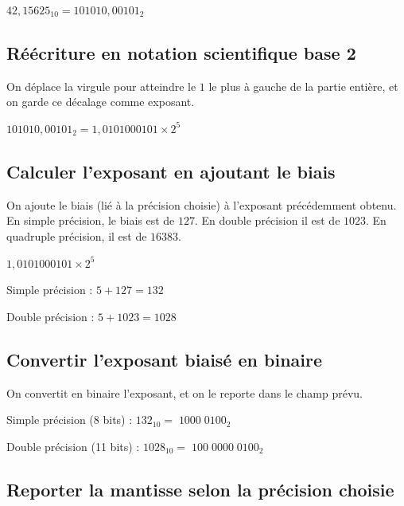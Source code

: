 \documentclass[11pt,a4paper]{article}
\begin{document}
$ 42,15625_{10} = 101010,00101_{2} $

\bigskip

\subsection{Réécriture en notation scientifique base 2}

\medskip

On déplace la virgule pour atteindre le $ 1 $ le plus à gauche de la partie entière, et on garde ce décalage comme exposant.

\medskip

$ 101010,00101_{2} = 1,0101000101 \times 2^{5} $

\bigskip

\subsection{Calculer l'exposant en ajoutant le biais}

\medskip

On ajoute le biais (lié à la précision choisie) à l'exposant précédemment obtenu.
En simple précision, le biais est de $ 127 $. En double précision il est de $ 1023 $. En quadruple précision, il est de $ 16383 $.

\medskip

$ 1,0101000101 \times 2^{5} $

\medskip

Simple précision : $ 5 + 127 = 132 $

\medskip

Double précision : $ 5 + 1023 = 1028 $

\bigskip

\subsection{Convertir l'exposant biaisé en binaire}

\medskip

On convertit en binaire l'exposant, et on le reporte dans le champ prévu.

\medskip

Simple précision (8 bits) : $ 132_{10} = \; 1000 \; 0100_{2} $

\medskip

Double précision (11 bits) : $ 1028_{10} = \; 100 \; 0000 \; 0100_{2} $

\bigskip

\subsection{Reporter la mantisse selon la précision choisie}
\end{document}
